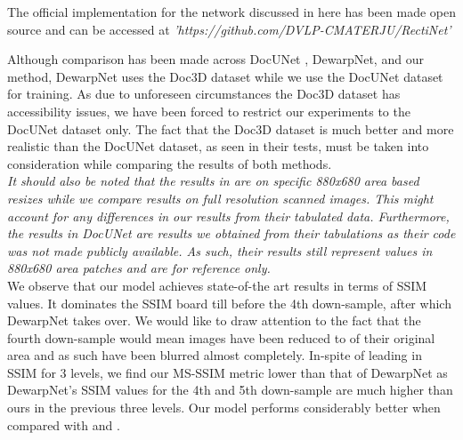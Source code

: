 \documentclass[a4paper,conference]{IEEEtran}
\begin{document}
	The official implementation for the network discussed in here has been made open source and can be accessed at \emph{'https://github.com/DVLP-CMATERJU/RectiNet'}
	
	
	
	Although comparison has been made across DocUNet \cite{Ma-CVPR18}, DewarpNet\cite{das2019dewarpnet}, and our method, DewarpNet uses the Doc3D dataset while we use the DocUNet dataset for training. As due to unforeseen circumstances the Doc3D dataset has accessibility issues, we have been forced to restrict our experiments to the DocUNet dataset only. The fact that the Doc3D dataset is much better and more realistic than the DocUNet dataset, as seen in their tests, must be taken into consideration while comparing the results of both methods. 
	\\
	
	\emph{It should also be noted that the results in \cite{das2019dewarpnet} are on specific 880x680 area based resizes while we compare results on full resolution scanned images. This might account for any differences in our  results from their tabulated data. Furthermore, the results in DocUNet\cite{Ma-CVPR18} are results we obtained from their tabulations as their code was not made publicly available. As such, their results still represent values in 880x680 area patches and are for reference only.}
	\\
	
	
	We observe that our model achieves state-of-the art results in terms of SSIM values. It dominates the SSIM board till before the 4th down-sample, after which DewarpNet takes over. We would like to draw attention to the fact that the fourth down-sample would mean images have been reduced to  of their original area and as such have been blurred almost completely. In-spite of leading in SSIM for 3 levels, we find our MS-SSIM metric lower than that of DewarpNet as DewarpNet's SSIM values for the 4th and 5th down-sample are much higher than ours in the previous three levels. Our model performs considerably better when compared with \cite{Ma-CVPR18} and \cite{tian2011rectification}.
	
\end{document}
